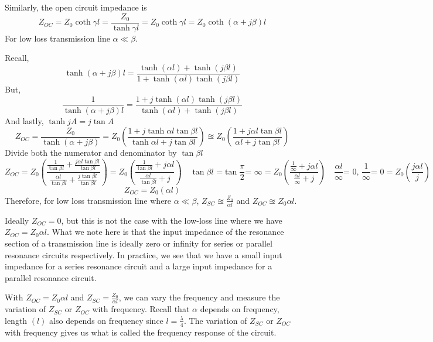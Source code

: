 Similarly, the open circuit impedance is 
\begin{dmath*}
Z_{OC}=Z_0\coth\gamma l=\frac{Z_0}{\tanh\gamma l}
=Z_0\coth\gamma l=Z_0\coth(\alpha+j\beta) l
\end{dmath*}
For low loss transmission line $ \alpha\ll\beta $.

Recall, 
\[ \tanh(\alpha+j\beta)l=\frac{\tanh (\alpha l) + \tanh (j\beta l)}{1 + \tanh (\alpha l)\tanh (j\beta l)} \]
But,
\[ \frac{1}{\tanh(\alpha+j\beta)l}=\frac{1 + j\tanh (\alpha l)\tanh (j\beta l)}{\tanh (\alpha l) + \tanh (j\beta l)} \]
And lastly, $ \tanh jA= j \tan A $
\begin{dmath*}
Z_{OC} = \frac{Z_0}{\tanh(\alpha+j\beta)}
=Z_0\left(\frac{1+j\tanh \alpha l\tan \beta l}{\tanh \alpha l+j\tan \beta l}\right)
\approxeq Z_0\left(\frac{1+ j \alpha l\tan \beta l}{\alpha l+j\tan \beta l}\right)
\end{dmath*}
Divide both the numerator and denominator by $ \tan \beta l $
\begin{dmath*}
Z_{OC}=Z_0\left(\frac{\frac{1}{\tan \beta l}+\frac{j \alpha l\tan \beta l}{\tan \beta l}}{\frac{\alpha l}{\tan \beta l}+\frac{j\tan \beta l}{\tan \beta l}}\right)
=Z_0\left(\frac{\frac{1}{\tan \beta l} + j \alpha l}{\frac{\alpha l}{\tan \beta l} + j}\right)\quad\tan\beta l\text{ =}\tan\frac{\pi}{2}\text{= }\infty
=Z_0\left(\frac{\frac{1}{\infty} + j \alpha l}{\frac{\alpha l}{\infty} + j}\right)\quad\frac{\alpha l}{\infty}\text{= 0, }\frac{1}{\infty}\text{= 0}
=Z_0\left(\frac{j \alpha l}{j}\right)
\end{dmath*}
\begin{equation}
Z_{OC}=Z_0(\alpha l)
\end{equation}
Therefore, for low loss transmission line where $\alpha\ll\beta$, $ Z_{SC}\approxeq \frac{Z_0}{\alpha l} $ and $ Z_{OC} \approxeq Z_0 \alpha l $. 

Ideally $ Z_{OC}=0 $, but this is not the case with the low-loss line where we have $ Z_{OC} = Z_0 \alpha l $. What we note here is that the input impedance of the resonance section of a transmission line is ideally zero or infinity for series or parallel resonance circuits respectively. In practice, we see that we have a small input impedance for a series resonance circuit and a large input impedance for a parallel resonance circuit.

With $ Z_{OC} = Z_0 \alpha l $ and 
$ Z_{SC}= \frac{Z_0}{\alpha l} $, we can vary the frequency and measure the variation of $ Z_{SC} $ or $ Z_{OC} $ with frequency. Recall that $ \alpha $ depends on frequency, length $(l)$ also depends on frequency since $ l=\frac{\lambda}{4} $. The variation of $ Z_{SC} $ or $ Z_{OC} $ with frequency gives us what is called the frequency response of the circuit.

